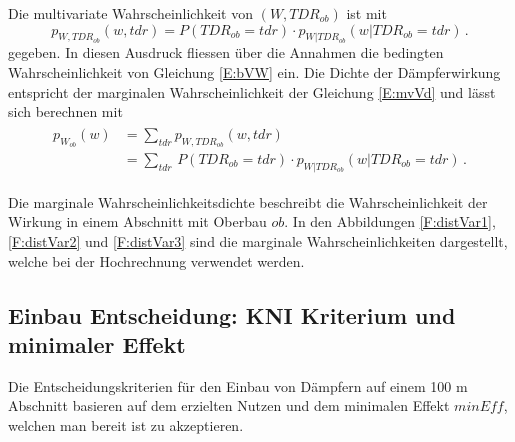 Die multivariate Wahrscheinlichkeit von $(W,TDR_{ob})$ ist mit
\begin{equation}
\label{E:mvVd}
	p_{W,TDR_{ob}}(w,tdr)= P(TDR_{ob}=tdr) \cdot p_{W|TDR_{ob}}(w|TDR_{ob}=tdr)\,.
\end{equation}
gegeben. In diesen Ausdruck fliessen über die Annahmen die bedingten Wahrscheinlichkeit von Gleichung \ref{E:bVW} ein. Die  Dichte der Dämpferwirkung entspricht der marginalen Wahrscheinlichkeit der Gleichung  \ref{E:mvVd} und lässt sich berechnen mit
\begin{align}
\begin{split}\label{E:p}
	p_{W_{ob}}(w)&=\sum_{tdr} p_{W,TDR_{ob}}(w,tdr)\\
	&=\sum_{tdr}\, P(TDR_{ob}=tdr)\cdot p_{W|TDR_{ob}}(w|TDR_{ob}=tdr)\,.
\end{split}
\end{align}

Die marginale Wahrscheinlichkeitsdichte beschreibt die Wahrscheinlichkeit der Wirkung in einem Abschnitt mit Oberbau $ob$. In den Abbildungen \ref{F:distVar1}, \ref{F:distVar2} und \ref{F:distVar3} sind die marginale Wahrscheinlichkeiten dargestellt, welche bei der Hochrechnung verwendet werden.
%
\FloatBarrier
\subsection{Einbau Entscheidung: KNI Kriterium und minimaler Effekt}
Die Entscheidungskriterien für den Einbau von Dämpfern auf einem 100 m Abschnitt basieren auf dem erzielten Nutzen und dem minimalen Effekt $minEff$, welchen man bereit ist zu akzeptieren.\\

